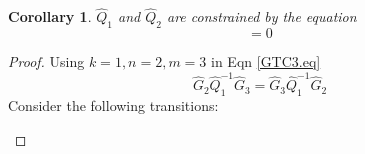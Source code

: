 \documentclass[11pt]{article}
\newtheorem{corollary}[theorem]{Corollary}
\newcommand{\h}{\hat}
\begin{document}
\begin{corollary}
$\h Q_1$ and $\h Q_2$ are constrained by the equation
\begin{equation}
[\h Q_1\h Q_2^{-1},\h Q_1^{-1}\h Q_2]=0
\end{equation}
\end{corollary}
\begin{proof}
Using $k=1,n=2,m=3$  in Eqn \eqref{GTC3.eq} 
\begin{equation}
\h G_2\h Q_1^{-1}\h G_3=\h G_3\h Q_1^{-1}\h G_2
\end{equation}
Consider  the following transitions: 
\begin{center}
\end{center}
\end{proof}
\end{document}
